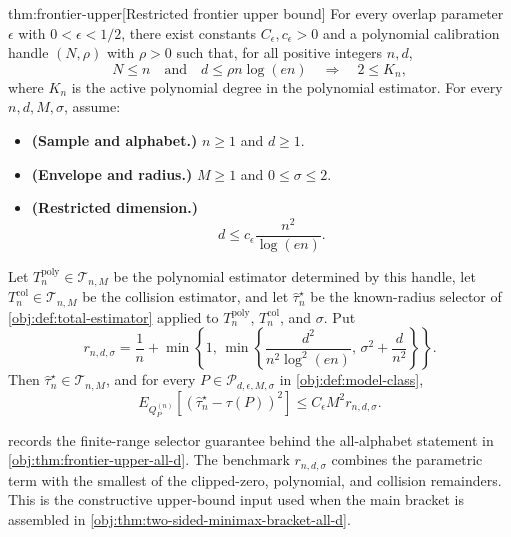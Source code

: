 \begin{theoremv}{thm:frontier-upper}[Restricted frontier upper bound]
For every overlap parameter \(\epsilon\) with \(0<\epsilon<1/2\), there exist constants \(C_{\epsilon},c_{\epsilon}>0\) and a polynomial calibration handle \((N,\rho)\) with \(\rho>0\) such that, for all positive integers \(n,d\),
\[
N\le n
\quad\text{and}\quad
d\le \rho n\log(en)
\quad\Longrightarrow\quad
2\le K_n ,
\]
where \(K_n\) is the active polynomial degree in the polynomial estimator.  For every \(n,d,M,\sigma\), assume:
\begin{itemize}
\item \textbf{(Sample and alphabet.)} \(n\ge1\) and \(d\ge1\).
\item \textbf{(Envelope and radius.)} \(M\ge1\) and \(0\le\sigma\le2\).
\item \textbf{(Restricted dimension.)}
\[
d\le c_{\epsilon}\frac{n^2}{\log(en)} .
\]
\end{itemize}
Let \(T_n^{\mathrm{poly}}\in\mathcal T_{n,M}\) be the polynomial estimator determined by this handle, let \(T_n^{\mathrm{col}}\in\mathcal T_{n,M}\) be the collision estimator, and let \(\widehat\tau_n^{\star}\) be the known-radius selector of \cref{obj:def:total-estimator} applied to \(T_n^{\mathrm{poly}}\), \(T_n^{\mathrm{col}}\), and \(\sigma\).  Put
\[
r_{n,d,\sigma}
=
\frac1n+
\min\left\{
1,\,
\min\left\{
\frac{d^2}{n^2\log^2(en)},\,
\sigma^2+\frac{d}{n^2}
\right\}
\right\}.
\]
Then \(\widehat\tau_n^{\star}\in\mathcal T_{n,M}\), and for every \(P\in\mathcal P_{d,\epsilon,M,\sigma}\) in \cref{obj:def:model-class},
\[
E_{Q_P^{(n)}}\!\left[
\left(\widehat\tau_n^{\star}-\tau(P)\right)^2
\right]
\le
C_{\epsilon}M^2 r_{n,d,\sigma}.
\]
\end{theoremv}

 records the finite-range selector guarantee behind the all-alphabet statement in \cref{obj:thm:frontier-upper-all-d}. The benchmark \(r_{n,d,\sigma}\) combines the parametric term with the smallest of the clipped-zero, polynomial, and collision remainders. This is the constructive upper-bound input used when the main bracket is assembled in \cref{obj:thm:two-sided-minimax-bracket-all-d}.
